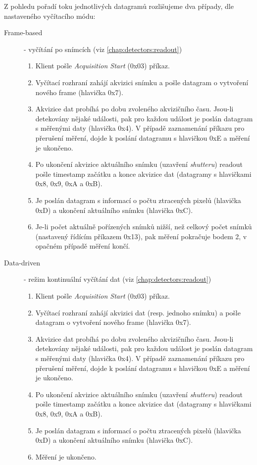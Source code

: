 Z pohledu pořadí toku jednotlivých datagramů rozlišujeme dva případy, dle nastaveného vyčítacího módu:
\begin{description}
   \item[Frame-based] - vyčítání po snímcích (viz \ref{chap:detectors:readout})
   \begin{enumerate}
       \item Klient pošle \textit{Acquisition Start} (0x03) příkaz.
       \item Vyčítací rozhraní zahájí akvizici snímku a pošle datagram o vytvoření nového frame (hlavička 0x7).
       \item Akvizice dat probíhá po dobu zvoleného akvizičního času. Jsou-li detekovány nějaké události, pak pro každou událost je poslán datagram s měřenými daty (hlavička 0x4). V případě zaznamenání příkazu pro přerušení měření, dojde k poslání datagramu s hlavičkou 0xE a měření je ukončeno.
       \item Po ukončení akvizice aktuálního snímku (uzavření \textit{shutteru}) readout pošle timestamp začátku a konce akvizice dat (datagramy s hlavičkami 0x8, 0x9, 0xA a 0xB).
       \item Je poslán datagram s informací o počtu ztracených pixelů (hlavička 0xD) a ukončení aktuálního snímku (hlavička 0xC).
       \item Je-li počet aktuálně pořízených snímků nižší, než celkový počet snímků (nastavený řídícím příkazem 0x13), pak měření pokračuje bodem 2, v opačném případě měření končí.
   \end{enumerate}
   \item[Data-driven] - režim kontinuální vyčítání dat (viz \ref{chap:detectors:readout})
   \begin{enumerate}
    \item Klient pošle \textit{Acquisition Start} (0x03) příkaz.
    \item Vyčítací rozhraní zahájí akvizici dat (resp. jednoho snímku) a pošle datagram o vytvoření nového frame (hlavička 0x7).
    \item Akvizice dat probíhá po dobu zvoleného akvizičního času. Jsou-li detekovány nějaké události, pak pro každou událost je poslán datagram s měřenými daty (hlavička 0x4). V případě zaznamenání příkazu pro přerušení měření, dojde k poslání datagramu s hlavičkou 0xE a měření je ukončeno.
    \item Po ukončení akvizice aktuálního snímku (uzavření \textit{shutteru}) readout pošle timestamp začátku a konce akvizice dat (datagramy s hlavičkami 0x8, 0x9, 0xA a 0xB).
    \item Je poslán datagram s informací o počtu ztracených pixelů (hlavička 0xD) a ukončení aktuálního snímku (hlavička 0xC).
    \item Měření je ukončeno.
\end{enumerate}
\end{description}

